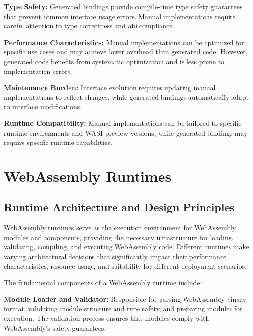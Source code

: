 \textbf{Type Safety:} Generated bindings provide compile-time type safety guarantees that prevent common interface usage errors. Manual implementations require careful attention to type correctness and \acrshort{abi} compliance.

\textbf{Performance Characteristics:} Manual implementations can be optimized for specific use cases and may achieve lower overhead than generated code. However, generated code benefits from systematic optimization and is less prone to implementation errors.

\textbf{Maintenance Burden:} Interface evolution requires updating manual implementations to reflect changes, while generated bindings automatically adapt to interface modifications.

\textbf{Runtime Compatibility:} Manual implementations can be tailored to specific runtime environments and WASI preview versions, while generated bindings may require specific runtime capabilities.

\section{WebAssembly Runtimes}
\label{sec:wasm-runtimes}

\subsection{Runtime Architecture and Design Principles}
\label{subsec:runtime-architecture}

WebAssembly runtimes serve as the execution environment for WebAssembly modules and components, providing the necessary infrastructure for loading, validating, compiling, and executing WebAssembly code. Different runtimes make varying architectural decisions that significantly impact their performance characteristics, resource usage, and suitability for different deployment scenarios.


The fundamental components of a WebAssembly runtime include:

\textbf{Module Loader and Validator:} Responsible for parsing WebAssembly binary format, validating module structure and type safety, and preparing modules for execution. The validation process ensures that modules comply with WebAssembly's safety guarantees.

